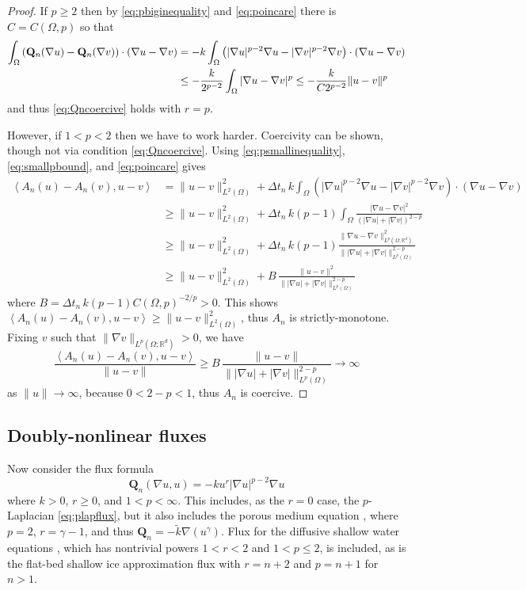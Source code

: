 \documentclass[final,onefignum]{siamart190516}
\newcommand\bQ{\mathbf{Q}}
\newcommand{\grad}{\nabla}
\newcommand{\ip}[2]{\ensuremath{\left<#1,#2\right>}}
\newcommand\RR{\mathbb{R}}
\begin{document}
\begin{proof} If $p\ge 2$ then by \eqref{eq:pbiginequality} and \eqref{eq:poincare} there is $C=C(\Omega,p)$ so that
\begin{align}
\int_\Omega \left(\bQ_n(\grad u) - \bQ_n(\grad v)\right)\cdot (\grad u - \grad v) &= -k  \int_\Omega \left(|\grad u|^{p-2} \grad u - |\grad v|^{p-2} \grad v\right)\cdot (\grad u - \grad v) \notag \\
  &\le - \frac{k}{2^{p-2}} \int_\Omega |\grad u - \grad v|^p \le - \frac{k}{C 2^{p-2}} \|u-v\|^p \label{eq:plapQnmono}
\end{align}
and thus \eqref{eq:Qncoercive} holds with $r=p$.

However, if  $1<p<2$ then we have to work harder.  Coercivity can be shown, though not via condition \eqref{eq:Qncoercive}.  Using \eqref{eq:psmallinequality}, \eqref{eq:smallpbound}, and \eqref{eq:poincare} gives
\begin{align*}
\ip{A_n(u) - A_n(v)}{u-v} &= \|u-v\|_{L^2(\Omega)}^2 + \Delta t_n\,k \int_\Omega \left(|\grad u|^{p-2} \grad u - |\grad v|^{p-2} \grad v\right)\cdot (\grad u - \grad v) \\
  &\ge \|u-v\|_{L^2(\Omega)}^2 + \Delta t_n\,k (p-1) \int_\Omega \frac{|\grad u - \grad v|^2}{\left(|\grad u|+|\grad v|\right)^{2-p}} \\
  &\ge \|u-v\|_{L^2(\Omega)}^2 + \Delta t_n\,k (p-1) \frac{\|\grad u - \grad v\|_{L^p(\Omega; \RR^d)}^2}{\big\||\grad u|+|\grad v|\big\|_{L^p(\Omega)}^{2-p}} \\
  &\ge \|u-v\|_{L^2(\Omega)}^2 + B\, \frac{\|u - v\|^2}{\big\||\grad u|+|\grad v|\big\|_{L^p(\Omega)}^{2-p}}
\end{align*}
where $B = \Delta t_n\,k (p-1) C(\Omega,p)^{-2/p} >0$.  This shows $\ip{A_n(u) - A_n(v)}{u-v} \ge \|u-v\|_{L^2(\Omega)}^2$, thus $A_n$ is strictly-monotone.  Fixing $v$ such that $\|\grad v\|_{L^p(\Omega;\RR^d)} >0$, we have
\begin{equation*}
\frac{\ip{A_n(u) - A_n(v)}{u-v}}{\|u-v\|} \ge B\, \frac{\|u - v\|}{\big\||\grad u|+|\grad v|\big\|_{L^p(\Omega)}^{2-p}} \to \infty
\end{equation*}
as $\|u\|\to\infty$, because $0<2-p<1$, thus $A_n$ is coercive. \end{proof}


\subsection{Doubly-nonlinear fluxes} \label{subsec:powertransform}  Now consider the flux formula
\begin{equation}
  \bQ_n(\grad u,u) = - k u^r |\grad u|^{p-2} \grad u \label{eq:doubleflux}
\end{equation}
where $k>0$, $r\ge 0$, and $1<p<\infty$.  This includes, as the $r=0$ case, the $p$-Laplacian \eqref{eq:plapflux}, but it also includes the porous medium equation \cite{Vazquez2007}, where $p=2$, $r=\gamma-1$, and thus $\bQ_n = - \tilde k \grad(u^\gamma)$.  Flux for the diffusive shallow water equations \cite{AlonsoSantillanaDawson2008}, which has nontrivial powers $1<r<2$ and $1<p\le 2$, is included, as is the flat-bed shallow ice approximation \cite{CalvoDuranyVazquez2000} flux with $r=n+2$ and $p=n+1$ for $n>1$.
\end{document}
